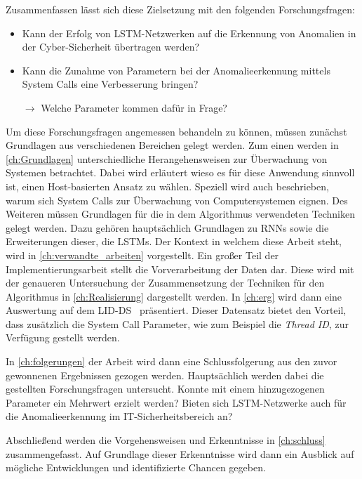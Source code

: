 Zusammenfassen lässt sich diese Zielsetzung mit den folgenden Forschungsfragen:
\begin{itemize}
    \item Kann der Erfolg von \ac{LSTM}-Netzwerken auf die Erkennung von Anomalien in der Cyber-Sicherheit übertragen werden?
    \item Kann die Zunahme von Parametern bei der Anomalieerkennung mittels System Calls eine Verbesserung bringen?

        $\rightarrow$ Welche Parameter kommen dafür in Frage?
\end{itemize}

Um diese Forschungsfragen angemessen behandeln zu können, müssen zunächst Grundlagen aus verschiedenen Bereichen gelegt werden.
Zum einen werden in \autoref{ch:Grundlagen} unterschiedliche Herangehensweisen zur Überwachung von Systemen betrachtet.
Dabei wird erläutert wieso es für diese Anwendung sinnvoll ist, einen Host-basierten Ansatz zu wählen.
Speziell wird auch beschrieben, warum sich System Calls zur Überwachung von Computersystemen eignen.
Des Weiteren müssen Grundlagen für die in dem Algorithmus verwendeten Techniken gelegt werden.
Dazu gehören hauptsächlich Grundlagen zu \acfp{RNN} sowie die Erweiterungen dieser, die \acp{LSTM}.
Der Kontext in welchem diese Arbeit steht, wird in \autoref{ch:verwandte_arbeiten} vorgestellt.
Ein großer Teil der Implementierungsarbeit stellt die Vorverarbeitung der Daten dar.
Diese wird mit der genaueren Untersuchung der Zusammensetzung der Techniken für den Algorithmus in \autoref{ch:Realisierung} dargestellt werden.
In \autoref{ch:erg} wird dann eine Auswertung auf dem \acf{LID-DS}~\cite{LID-DS} präsentiert.
Dieser Datensatz bietet den Vorteil, dass zusätzlich die System Call Parameter, wie zum Beispiel die \textit{Thread ID}, zur Verfügung gestellt werden.\par\medskip

In \autoref{ch:folgerungen} der Arbeit wird dann eine Schlussfolgerung aus den zuvor gewonnenen Ergebnissen gezogen werden. 
Hauptsächlich werden dabei die gestellten Forschungsfragen untersucht.
Konnte mit einem hinzugezogenen Parameter ein Mehrwert erzielt werden?
Bieten sich LSTM-Netzwerke auch für die Anomalieerkennung im IT-Sicherheitsbereich an?\par\medskip

Abschließend werden die Vorgehensweisen und Erkenntnisse in \autoref{ch:schluss} zusammengefasst.
Auf Grundlage dieser Erkenntnisse wird dann ein Ausblick auf mögliche Entwicklungen und identifizierte Chancen gegeben. 

